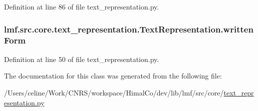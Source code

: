 Definition at line 86 of file text\+\_\+representation.\+py.

\hypertarget{classlmf_1_1src_1_1core_1_1text__representation_1_1_text_representation_a029a488706154d5fe42ecbea00974780}{
\subsubsection[{written\+Form}]{\setlength{\rightskip}{0pt plus 5cm}lmf.\+src.\+core.\+text\+\_\+representation.\+Text\+Representation.\+written\+Form}}\label{classlmf_1_1src_1_1core_1_1text__representation_1_1_text_representation_a029a488706154d5fe42ecbea00974780}


Definition at line 50 of file text\+\_\+representation.\+py.



The documentation for this class was generated from the following file\+:\begin{DoxyCompactItemize}
\item 
/\+Users/celine/\+Work/\+C\+N\+R\+S/workspace/\+Himal\+Co/dev/lib/lmf/src/core/\hyperlink{text__representation_8py}{text\+\_\+representation.\+py}\end{DoxyCompactItemize}
